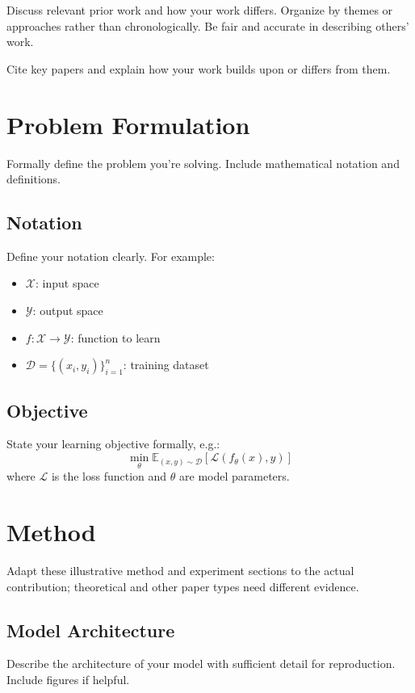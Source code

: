 \documentclass{article}
\begin{document}
Discuss relevant prior work and how your work differs. Organize by themes or approaches rather than chronologically. Be fair and accurate in describing others' work.

Cite key papers \cite{lecun2015deep, vaswani2017attention, devlin2019bert} and explain how your work builds upon or differs from them.

\section{Problem Formulation}
\label{sec:problem}

Formally define the problem you're solving. Include mathematical notation and definitions.

\subsection{Notation}
Define your notation clearly. For example:
\begin{itemize}
    \item $\mathcal{X}$: input space
    \item $\mathcal{Y}$: output space
    \item $f: \mathcal{X} \rightarrow \mathcal{Y}$: function to learn
    \item $\mathcal{D} = \{(x_i, y_i)\}_{i=1}^n$: training dataset
\end{itemize}

\subsection{Objective}
State your learning objective formally, e.g.:
\begin{equation}
\min_{\theta} \mathbb{E}_{(x,y) \sim \mathcal{D}} \left[ \mathcal{L}(f_\theta(x), y) \right]
\end{equation}
where $\mathcal{L}$ is the loss function and $\theta$ are model parameters.

\section{Method}
\label{sec:method}

Adapt these illustrative method and experiment sections to the actual contribution; theoretical and other paper types need different evidence.

\subsection{Model Architecture}
Describe the architecture of your model with sufficient detail for reproduction. Include figures if helpful.
\end{document}

